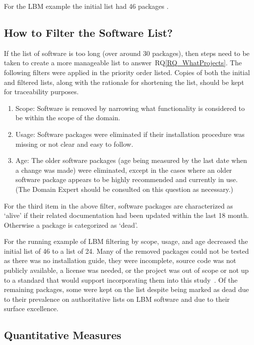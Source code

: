 \documentclass[runningheads]{llncs}
\newcommand{\rqref}[1]{RQ\ref{#1}}
\begin{document}
For the LBM example the initial list had 46 packages \cite{Michalski2021}.

\subsection{How to Filter the Software List?} \label{filtersoftware}

If the list of software is too long (over around 30 packages), then steps need
to be taken to create a more manageable list to answer~\rqref{RQ_WhatProjects}.
The following filters were applied in the priority order listed. Copies of both
the initial and filtered lists, along with the rationale for shortening the
list, should be kept for traceability purposes.

\begin{enumerate}
	\item Scope: Software is removed by narrowing what functionality is
	considered to be within the scope of the domain.
	\item Usage: Software packages were eliminated if their installation
	procedure was missing or not clear and easy to follow.
	\item Age: The older software packages (age being measured by the last date
	when a change was made) were eliminated, except in the cases where an older
	software package appears to be highly recommended and currently in use. (The
	Domain Expert should be consulted on this question as necessary.)
\end{enumerate}

For the third item in the above filter, software packages are characterized as
`alive' if their related documentation had been updated within the last 18
month. Otherwise a package is categorized as `dead'.

For the running example of LBM filtering by scope, usage, and age decreased the
initial list of 46 to a list of 24. Many of the removed packages could not be
tested as there was no installation guide, they were incomplete, source code was
not publicly available, a license was needed, or the project was out of scope or
not up to a standard that would support incorporating them into this
study~\cite{Michalski2021}. Of the remaining packages, some were kept on the
list despite being marked as dead due to their prevalence on authoritative lists
on LBM software and due to their surface excellence.

\subsection{Quantitative Measures} \label{empiricalmeasures}
\end{document}
